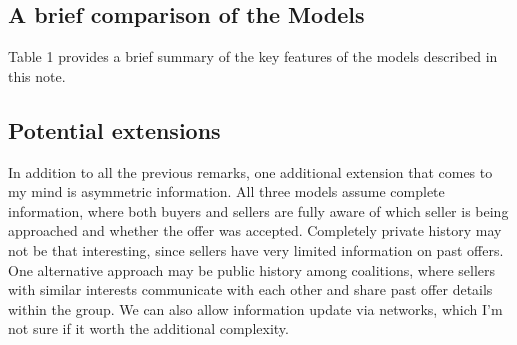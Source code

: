 \documentclass[ProjectGAZ]{subfiles}
\begin{document}
\subsection{A brief comparison of the Models}

Table 1 provides a brief summary of the key features of the models described in this note.


\subsection{Potential extensions}

In addition to all the previous remarks, one additional extension that comes to my mind is asymmetric information. All three models assume complete information, where both buyers and sellers are fully aware of which seller is being approached and whether the offer was accepted.
Completely private history may not be that interesting, since sellers have very limited information on past offers. One alternative approach may be public history among coalitions, where sellers with similar interests communicate with each other and share past offer details within the group. We can also allow information update via networks, which I'm not sure if it worth the additional complexity.


\newpage





\onlyinsubfile{}
%
\end{document}
